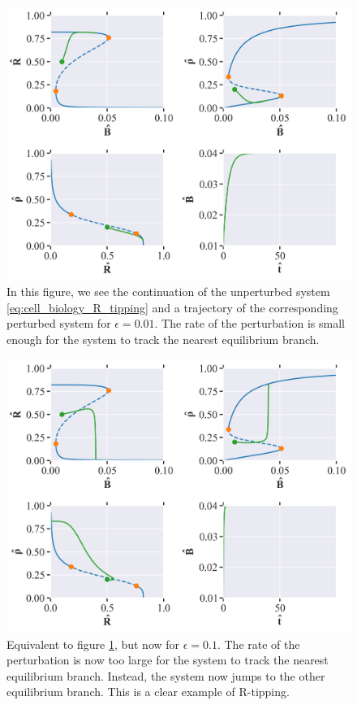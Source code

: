 \begin{figure}[H]
    \centering
    \includegraphics[width= \textwidth]{figures/cb_rtip_R(0)=0.5_rho(0)=0.2_B(0)_0.01_eps=0.01_Bmax=0.04.png}
    \caption{In this figure, we see the continuation of the unperturbed system \ref{eq:cell_biology_R_tipping} and a trajectory of the corresponding perturbed system for $\epsilon = 0.01$.
    The rate of the perturbation is small enough for the system to track the nearest equilibrium branch.}
    \label{fig:cell_biology_R_tipping_small}
\end{figure}

\begin{figure}[H]
    \centering
    \includegraphics[width= \textwidth]{figures/cb_rtip_R(0)=0.5_rho(0)=0.2_B(0)_0.01_eps=0.1_Bmax=0.04.png}
    \caption{Equivalent to figure \ref{fig:cell_biology_R_tipping_small}, but now for $\epsilon = 0.1$. The rate of the perturbation is now too large for the system to track the nearest equilibrium branch.
    Instead, the system now jumps to the other equilibrium branch. This is a clear example of R-tipping.}
    \label{fig:cell_biology_R_tipping_big}
\end{figure}


